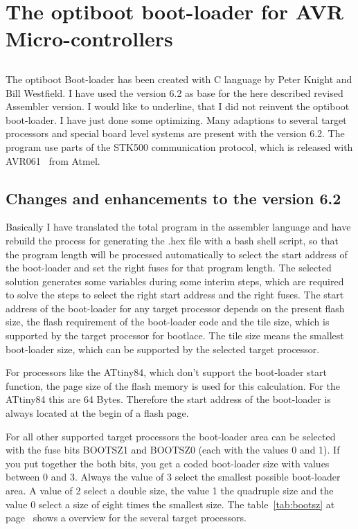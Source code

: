 \chapter{The optiboot boot-loader for AVR Micro-controllers}

\section*{}
The optiboot Boot-loader has been created with C language by Peter Knight and
Bill Westfield. I have used the version 6.2 as base
for the here described revised Assembler version.
I would like to underline, that I did not reinvent the
optiboot boot-loader. I have just done some optimizing.
Many adaptions to several target processors and special
board level systems are present with the version 6.2.
The program use parts of the STK500 communication protocol,
which is released with AVR061~\cite{stk500} from Atmel.


\section{Changes and enhancements to the version 6.2}
Basically I have translated the total program in the assembler language
and have rebuild the process for generating the .hex file
with a bash shell script, so that the program length will
be processed automatically to select the start address of the boot-loader
and set the right fuses for that program length.
The selected solution generates some variables during some
interim steps, which are required to solve the steps
to select the right start address and the right fuses.
The start address of the boot-loader for any target processor
depends on the present flash size, the flash requirement
of the boot-loader code and the tile size, which is supported
by the target processor for bootlace.
The tile size means the smallest boot-loader size, which can be supported
by the selected target processor.


For processors like the ATtiny84, which don't support the boot-loader start function,
the page size of the flash memory is used for this calculation.
For the ATtiny84 this are 64 Bytes. Therefore the start address of
the boot-loader is always located at the begin of a flash page.

For all other supported target processors the boot-loader area can be
selected with the fuse bits BOOTSZ1 and BOOTSZ0 (each with the values 0 and 1).
If you put together the both bits, you get a coded boot-loader size
with values between 0 and 3.
Always the value of 3 select the smallest possible boot-loader area.
A value of 2 select a double size, the value 1 the quadruple size
and the value 0 select a size of eight times the smallest size.
The table~\ref{tab:bootsz} at page~\pageref{tab:bootsz} shows a 
overview for the several target processors.

